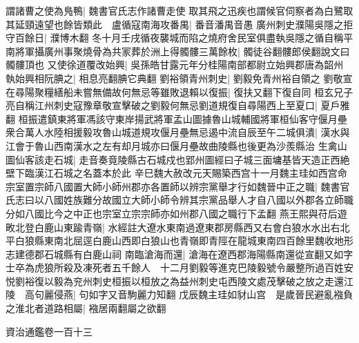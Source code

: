 謂諸曹之使為鳬鴨|{
	魏書官氏志作諸曹走使}
取其飛之迅疾也謂候官伺察者為白鷺取其延頸遠望也餘皆類此　盧循寇南海攻番禺|{
	番音潘禺音愚}
廣州刺史濮陽吳隱之拒守百餘日|{
	濮博木翻}
冬十月壬戌循夜襲城而陷之燒府舍民室俱盡執吳隱之循自稱平南將軍攝廣州事聚燒骨為共冡葬於洲上得髑髏三萬餘枚|{
	髑徒谷翻髏郎侯翻說文曰髑髏頂也}
又使徐道覆改始興|{
	吳孫皓甘露元年分桂陽南部都尉立始興郡唐為韶州}
執始興相阮腆之|{
	相息亮翻腆它典翻}
劉裕領青州刺史|{
	劉毅免青州裕自領之}
劉敬宣在尋陽聚糧繕船未嘗無備故何無忌等雖敗退賴以復振|{
	復扶又翻下復自同}
桓玄兄子亮自稱江州刺史寇豫章敬宣擊破之劉毅何無忌劉道規復自尋陽西上至夏口|{
	夏戶雅翻}
桓振遣鎮東將軍馮該守東岸揚武將軍孟山圖據魯山城輔國將軍桓仙客守偃月壘衆合萬人水陸相援毅攻魯山城道規攻偃月壘無忌遏中流自辰至午二城俱潰|{
	漢水與江會于魯山西南漢水之左有却月城亦曰偃月壘故曲陵縣也後更為沙羨縣治}
生禽山圖仙客該走石城|{
	走音奏竟陵縣古石城戍也郢州圖經曰子城三面墉基皆天造正西絶壁下臨漢江石城之名蓋本於此}
辛巳魏大赦改元天賜築西宫十一月魏主珪如西宫命宗室置宗師八國置大師小師州郡亦各置師以辨宗黨舉才行如魏晉中正之職|{
	魏書官氏志曰以八國姓族難分故國立大師小師令辨其宗黨品舉人才自八國以外郡各立師職分如八國比今之中正也宗室立宗宗師亦如州郡八國之職行下孟翻}
燕王熙與苻后遊畋北登白鹿山東踰青嶺|{
	水經註大遼水東南過遼東郡房縣西又右會白狼水水出右北平白狼縣東南北屈逕白鹿山西即白狼山也青嶺即青陘在龍城東南四百餘里魏收地形志建德郡石城縣有白鹿山祠}
南臨滄海而還|{
	滄海在遼西郡海陽縣南還從宣翻又如字}
士卒為虎狼所殺及凍死者五千餘人　十二月劉毅等進克巴陵毅號令嚴整所過百姓安悦劉裕復以毅為兖州刺史桓振以桓放之為益州刺史屯西陵文處茂擊破之放之走還江陵　高句麗侵燕|{
	句如字又音駒麗力知翻}
戊辰魏主珪如豺山宫　是歲晉民避亂襁負之淮北者道路相屬|{
	襁居兩翻屬之欲翻}


資治通鑑卷一百十三

